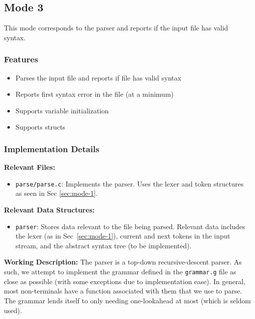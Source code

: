 \subsection{Mode 3}
\label{sec:mode-3}

This mode corresponds to the parser and reports if the input file has valid syntax.

\subsubsection{Features}

\begin{itemize}
    \item Parses the input file and reports if file has valid syntax
    \item Reports first syntax error in the file (at a minimum)
    \item Supports variable initialization
    \item Supports structs
\end{itemize}

\subsubsection{Implementation Details}

\textbf{Relevant Files:}

\begin{itemize}
    \item \verb|parse/parse.c|: Implements the parser. Uses the lexer and token
    structures as seen in Sec \ref{sec:mode-1}.
\end{itemize}

\noindent \textbf{Relevant Data Structures:}

\begin{itemize}
    \item \verb|parser|: Stores data relevant to the file being parsed. Relevant
    data includes the lexer (as in Sec~\ref{sec:mode-1}), current and next
    tokens in the input stream, and the abstract syntax tree (to be
    implemented).
\end{itemize}

\noindent \textbf{Working Description:} The parser is a top-down
recursive-descent parser. As such, we attempt to implement the grammar defined
in the \verb|grammar.g| file as close as possible (with some exceptions due to
implementation ease). In general, most non-terminals have a function associated
with them that we use to parse. The grammar lends itself to only needing
one-lookahead at most (which is seldom used).

